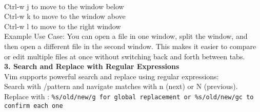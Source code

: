 \documentclass[a4paper,12pt]{article}
\begin{document}
\\Ctrl-w j to move to the window below
\\Ctrl-w k to move to the window above
\\Ctrl-w l to move to the right window
\\Example Use Case:
You can open a file in one window, split the window, and then open a different file in the second window. This makes it easier to compare or edit multiple files at once without switching back and forth between tabs.
\\\textbf{3. Search and Replace with Regular Expressions}
\\Vim supports powerful search and replace using regular expressions:
\\Search with /pattern and navigate matches with n (next) or N (previous).
Replace with :
\texttt{\%s/old/new/g for global replacement or \%s/old/new/gc to confirm each one}
\end{document}
